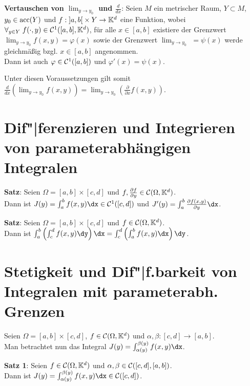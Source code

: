 \textbf{Vertauschen von $\lim_{y \to y_0}$ und $\frac{d}{dx}$}:
Seien $M$ ein metrischer Raum, $Y \subset M$, $y_0 \in \operatorname{acc}(Y)$ und
$f: \left]a,b\right[ \times Y \rightarrow \mathbb{K}^d$ eine Funktion, wobei
$\forall_{y \in Y}\; f(\cdot, y) \in \mathcal{C}^1([a,b], \mathbb{K}^d)$,
für alle $x \in [a,b]$ existiere der Grenzwert
$\lim_{y \to y_0} f(x,y) = \varphi(x)$ sowie der Grenzwert
$\lim_{y \to y_0}$  $= \psi(x)$
werde gleichmäßig bzgl. $x \in [a,b]$ angenommen. \\
Dann ist auch $\varphi \in \mathcal{C}^1([a,b])$ und $\varphi'(x) = \psi(x)$.

Unter diesen Voraussetzungen gilt somit
$\frac{d}{dx} \left(\lim_{y \to y_0} f(x,y)\right) =
\lim_{y \to y_0} \left(\frac{\partial}{\partial x} f(x,y)\right)$.


\section{%
    Dif"|ferenzieren und Integrieren von parameterabhängigen Integralen%
}

\textbf{Satz}:
Seien $\Omega = [a,b] \times [c,d]$
und $f, \frac{\partial f}{\partial y} \in \mathcal{C}(\Omega, \mathbb{K}^d)$. \\
Dann ist $J(y) = \int_a^b f(x,y)\dx \in \C^1([c,d])$
und $J'(y) = \int_a^b \frac{\partial f(x,y)}{\partial y} \dx$.

\textbf{Satz}: Seien $\Omega = [a,b] \times [c,d]$ und
$f \in \mathcal{C}(\Omega, \mathbb{K}^d)$. \\
Dann ist $\int_a^b \left(\int_c^d f(x,y)\dy\right)\dx
= \int_c^d \left(\int_a^b f(x,y)\dx\right)\dy$.

\section{%
    Stetigkeit und Dif"|f.barkeit von Integralen mit parameterabh.
    Grenzen%
}

Seien $\Omega = [a,b] \times [c,d]$, $f \in \mathcal{C}(\Omega, \mathbb{K}^d)$
und $\alpha, \beta: [c,d] \rightarrow [a,b]$. \\
Man betrachtet nun das Integral $J(y) = \int_{\alpha(y)}^{\beta(y)} f(x,y)\dx$.

\textbf{Satz 1}: Seien $f \in \mathcal{C}(\Omega, \mathbb{K}^d)$ und
$\alpha, \beta \in \mathcal{C}([c,d], [a,b])$. \\
Dann ist $J(y) = \int_{\alpha(y)}^{\beta(y)} f(x,y)\dx \in \C([c,d])$.

